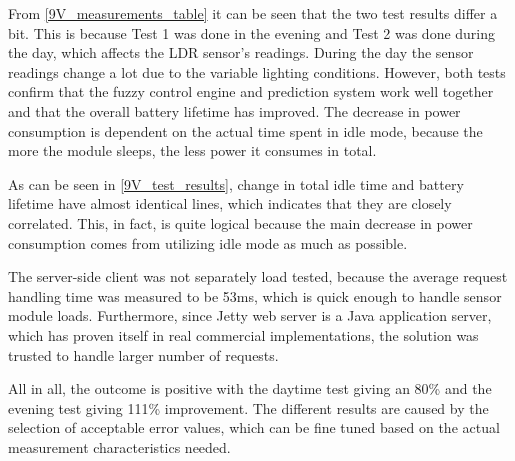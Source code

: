 From \autoref{9V_measurements_table} it can be seen that the two test results differ a bit. This is because Test 1 was done in the evening and Test 2 was done during the day, which affects the LDR sensor's readings. During the day the sensor readings change a lot due to the variable lighting conditions. However, both tests confirm that the fuzzy control engine and prediction system work well together and that the overall battery lifetime has improved. The decrease in power consumption is dependent on the actual time spent in idle mode, because the more the module sleeps, the less power it consumes in total. 

As can be seen in \autoref{9V_test_results}, change in total idle time and battery lifetime have almost identical lines, which indicates that they are closely correlated. This, in fact, is quite logical because the main decrease in power consumption comes from utilizing idle mode as much as possible. 

The server-side client was not separately load tested, because the average request handling time was measured to be 53ms, which is quick enough to handle sensor module loads. Furthermore, since Jetty web server is a Java application server, which has proven itself in real commercial implementations, the solution was trusted to handle larger number of requests.

All in all, the outcome is positive with the daytime test giving an 80\% and the evening test giving 111\% improvement. The different results are caused by the selection of acceptable error values, which can be fine tuned based on the actual measurement characteristics needed. 


